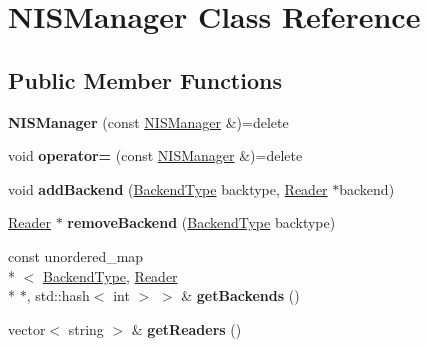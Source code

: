 \hypertarget{classNISManager}{\section{N\-I\-S\-Manager Class Reference}
\label{classNISManager}
}
\subsection*{Public Member Functions}
\begin{DoxyCompactItemize}
\item 
\hypertarget{classNISManager_a5694196f1df5f18ab9a2c8061075175e}{{\bfseries N\-I\-S\-Manager} (const \hyperlink{classNISManager}{N\-I\-S\-Manager} \&)=delete}\label{classNISManager_a5694196f1df5f18ab9a2c8061075175e}

\item 
\hypertarget{classNISManager_af191b49bf25bbf9bfd2cb5bd9cd9c434}{void {\bfseries operator=} (const \hyperlink{classNISManager}{N\-I\-S\-Manager} \&)=delete}\label{classNISManager_af191b49bf25bbf9bfd2cb5bd9cd9c434}

\item 
\hypertarget{classNISManager_a0f9aae95eed46cd8cdea72bbdb526960}{void {\bfseries add\-Backend} (\hyperlink{nis__types_8h_acee299fbb7d897867808250049524594}{Backend\-Type} backtype, \hyperlink{classnis_1_1interface_1_1Reader}{Reader} $\ast$backend)}\label{classNISManager_a0f9aae95eed46cd8cdea72bbdb526960}

\item 
\hypertarget{classNISManager_a06be1bb52580b9af3466b0094da7fd03}{\hyperlink{classnis_1_1interface_1_1Reader}{Reader} $\ast$ {\bfseries remove\-Backend} (\hyperlink{nis__types_8h_acee299fbb7d897867808250049524594}{Backend\-Type} backtype)}\label{classNISManager_a06be1bb52580b9af3466b0094da7fd03}

\item 
\hypertarget{classNISManager_aa844d08a0c89c8143380d9f55abb7e56}{const unordered\-\_\-map\\*
$<$ \hyperlink{nis__types_8h_acee299fbb7d897867808250049524594}{Backend\-Type}, \hyperlink{classnis_1_1interface_1_1Reader}{Reader} \\*
$\ast$, std\-::hash$<$ int $>$ $>$ \& {\bfseries get\-Backends} ()}\label{classNISManager_aa844d08a0c89c8143380d9f55abb7e56}

\item 
\hypertarget{classNISManager_a27a3db14eb804948d4031f115d3f6234}{vector$<$ string $>$ \& {\bfseries get\-Readers} ()}\label{classNISManager_a27a3db14eb804948d4031f115d3f6234}


\end{DoxyCompactItemize}
